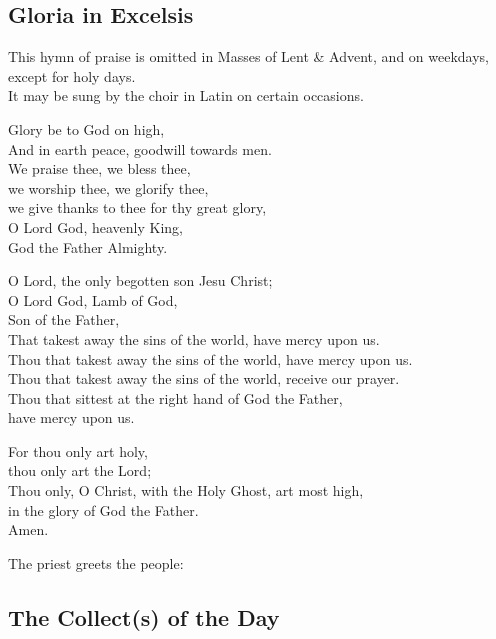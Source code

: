 \subsection{Gloria in Excelsis}

\begin{rubric}
This hymn of praise is omitted in Masses of Lent \& Advent, and on weekdays, except for holy days.\\
It may be sung by the choir in Latin on certain occasions.
\end{rubric}

Glory be to God on high,\\
And in earth peace, goodwill towards men.\\
We praise thee, we bless thee,\\
we worship thee, we glorify thee,\\
we give thanks to thee for thy great glory,\\
O Lord God, heavenly King,\\
God the Father Almighty.

O Lord, the only begotten son Jesu Christ;\\
O Lord God, Lamb of God,\\
Son of the Father,\\
That takest away the sins of the world, have mercy upon us.\\
Thou that takest away the sins of the world, have mercy upon us.\\
Thou that takest away the sins of the world, receive our prayer.\\
Thou that sittest at the right hand of God the Father,\\
have mercy upon us.

For thou only art holy,\\
thou only art the Lord;\\
Thou only, O Christ, with the Holy Ghost, art most high,\\
\cross in the glory of God the Father.\\
Amen.

\begin{rubric}
The priest greets the people:
\end{rubric}


\subsection{The Collect(s) of the Day}

